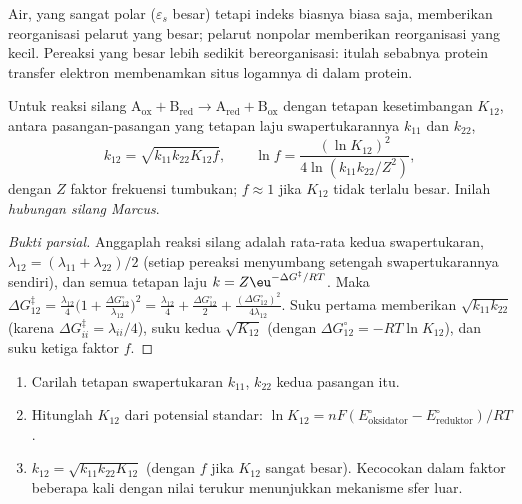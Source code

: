 \admitted

Air, yang sangat polar ($\varepsilon_s$ besar) tetapi indeks biasnya biasa saja, memberikan
reorganisasi pelarut yang besar; pelarut nonpolar memberikan reorganisasi yang kecil. Pereaksi yang
besar lebih sedikit bereorganisasi: itulah sebabnya protein transfer elektron
membenamkan situs logamnya di dalam protein.

\begin{theorem}\label{thm:b3:complex-mechanisms:cross-relation}
Untuk reaksi silang $\mathrm{A_{ox} + B_{red} \to A_{red} + B_{ox}}$ dengan tetapan kesetimbangan $K_{12}$, antara pasangan-pasangan
yang tetapan laju swapertukarannya $k_{11}$ dan $k_{22}$,
\[
  k_{12} = \sqrt{k_{11}k_{22}K_{12}f}, \qquad \ln f = \frac{(\ln K_{12})^2}{4\ln(k_{11}k_{22}/Z^2)},
\]
dengan $Z$ faktor frekuensi tumbukan; $f \approx 1$ jika $K_{12}$ tidak terlalu besar. Inilah
\emph{hubungan silang Marcus}.
\end{theorem}

\begin{proof}[Bukti parsial]
Anggaplah  reaksi silang adalah rata-rata 
kedua swapertukaran, $\lambda_{12} = (\lambda_{11} + \lambda_{22})/2$ (setiap pereaksi menyumbang setengah 
swapertukarannya sendiri), dan semua tetapan laju $k = Z\eu^{-\Delta G^{\ddagger}/RT}$. Maka
$\Delta G_{12}^{\ddagger} = \frac{\lambda_{12}}{4}\bigl(1 + \frac{\Delta G^\circ_{12}}{\lambda_{12}}\bigr)^2 = \frac{\lambda_{12}}{4} + \frac{\Delta G^\circ_{12}}{2} + \frac{(\Delta G^\circ_{12})^2}{4\lambda_{12}}$. Suku pertama memberikan
$\sqrt{k_{11}k_{22}}$ (karena $\Delta G^{\ddagger}_{ii} = \lambda_{ii}/4$), suku kedua $\sqrt{K_{12}}$ (dengan $\Delta G^\circ_{12} = -RT\ln K_{12}$), dan suku ketiga
faktor $f$.
\end{proof}

\begin{method}\label{met:b3:complex-mechanisms:marcus-estimate}
\begin{enumerate}
  \item Carilah tetapan swapertukaran $k_{11}$, $k_{22}$ kedua pasangan itu.
  \item Hitunglah $K_{12}$ dari potensial standar: $\ln K_{12} = nF(E^\circ_{\text{oksidator}} - E^\circ_{\text{reduktor}})/RT$.
  \item $k_{12} = \sqrt{k_{11}k_{22}K_{12}}$ (dengan $f$ jika $K_{12}$ sangat besar). Kecocokan dalam
        faktor beberapa kali dengan nilai terukur menunjukkan mekanisme sfer luar.
\end{enumerate}
\end{method}

